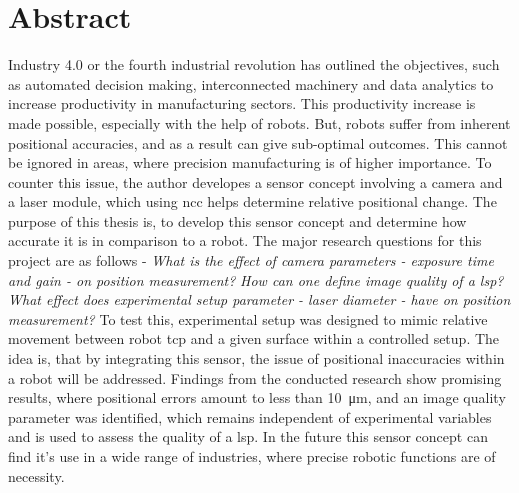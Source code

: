 \chapter*{Abstract}

Industry 4.0 or the fourth industrial revolution has outlined the objectives, such as automated decision making, interconnected machinery and data analytics to increase productivity in manufacturing sectors. This productivity increase is made possible, especially with the help of robots. But, robots suffer from inherent positional accuracies, and as a result can give sub-optimal outcomes. This cannot be ignored in areas, where precision manufacturing is of higher importance. To counter this issue, the author developes a sensor concept involving a camera and a laser module, which using \gls{ncc} helps determine relative positional change. The purpose of this thesis is, to develop this sensor concept and determine how accurate it is in comparison to a robot. The major research questions for this project are as follows - \emph{What is the effect of camera parameters - exposure time and gain - on position measurement?} \emph{How can one define image quality of a \gls{lsp}?} \emph{What effect does experimental setup parameter - laser diameter - have on position measurement?} To test this, experimental setup was designed to mimic relative movement between robot \gls{tcp} and a given surface within a controlled setup. The idea is, that by integrating this sensor, the issue of positional inaccuracies within a robot will be addressed. Findings from the conducted research show promising results, where positional errors amount to less than \SI{10}{\micro\meter}, and an image quality parameter was identified, which remains independent of experimental variables and is used to assess the quality of a \gls{lsp}. In the future this sensor concept can find it's use in a wide range of industries, where precise robotic functions are of necessity.